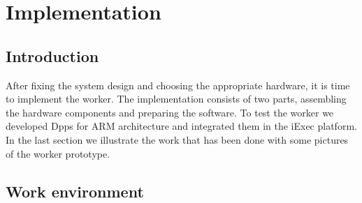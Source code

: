 

\chapter{Implementation}


\section{Introduction}
    After fixing the system design and choosing the appropriate hardware, it is time to implement the worker.
    The implementation consists of two parts, assembling the hardware components and preparing the software.
    To test the worker we developed Dpps for ARM architecture and integrated them in the iExec platform.
    In the last section we illustrate the work that has been done with some pictures of the worker prototype.

\section{Work environment}


